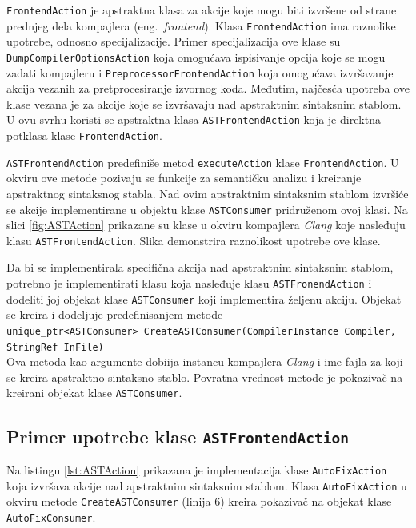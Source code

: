 \documentclass[12pt,oneside]{memoir}
\begin{document}
\texttt{FrontendAction} je apstraktna klasa za akcije koje mogu biti izvr\v{s}ene od strane prednjeg dela kompajlera (eng.~\textit{frontend}).
Klasa \texttt{FrontendAction} ima raznolike upotrebe, odnosno specijalizacije. Primer specijalizacija ove klase su \texttt{DumpCompiler\-OptionsAction}
koja omogu\'{c}ava ispisivanje opcija koje se mogu zadati kompajleru i \texttt{PreprocessorFrontendAction} koja omogu\'{c}ava izvr\v{s}avanje akcija vezanih za pretprocesiranje izvornog koda. Međutim, naj\v{c}es\'{c}a upotreba ove klase vezana je za akcije koje se izvr\v{s}avaju nad apstraktnim sintaksnim stablom. U ovu svrhu koristi se apstraktna klasa \texttt{ASTFrontendAction} koja je direktna potklasa klase \texttt{FrontendAction}. \par
\texttt{ASTFrontendAction} predefini\v{s}e metod \texttt{executeAction} klase \texttt{FrontendAction}. U okviru ove metode pozivaju se funkcije za semanti\v{c}ku analizu i kreiranje apstraktnog sintaksnog stabla. Nad ovim apstraktnim sintaksnim stablom izvr\v{s}i\'{c}e se akcije implementirane u objektu klase \texttt{ASTConsumer} pridru\v{z}enom ovoj klasi.
Na slici \ref{fig:ASTAction} prikazane su klase u okviru kompajlera \textit{Clang} koje nasleđuju klasu \texttt{ASTFrontendAction}. Slika demonstrira raznolikost upotrebe ove klase. \par
Da bi se implementirala specifi\v{c}na akcija nad apstraktnim sintaksnim stablom, potrebno je implementirati klasu koja nasleđuje klasu \texttt{ASTFronendAction} i dodeliti joj objekat klase \texttt{ASTConsumer} koji implementira \v{z}eljenu akciju. Objekat se kreira i dodeljuje predefinisanjem metode \\ 
\texttt{unique\_ptr<ASTConsumer> CreateASTConsumer(CompilerInstance Compiler,} \\
\hspace*{9cm} \texttt{StringRef InFile)} \\ 
Ova metoda kao argumente dobiija instancu kompajlera \textit{Clang} i ime fajla za koji se kreira apstraktno sintaksno stablo. Povratna vrednost metode je pokaziva\v{c} na kreirani objekat klase \texttt{ASTConsumer}.
\subsection{Primer upotrebe klase \texttt{ASTFrontendAction}}
Na listingu \ref{lst:ASTAction} prikazana je implementacija klase \texttt{AutoFixAction} koja izvr\v{s}ava akcije nad apstraktnim sintaksnim stablom.
Klasa \texttt{AutoFixAction} u okviru metode \texttt{CreateASTConsumer} (linija 6) kreira pokaziva\v{c} na objekat klase \texttt{AutoFixConsumer}.
\end{document}
